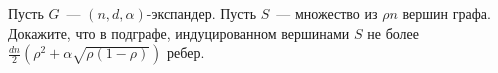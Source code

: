 Пусть $G$~--- $(n, d, \alpha)$-экспандер. Пусть $S$~--- множество из $\rho n$ вершин графа. Докажите, что в подграфе,
индуцированном вершинами $S$ не более $\frac{dn}{2} (\rho^2 + \alpha \sqrt{\rho (1 - \rho)})$ ребер.